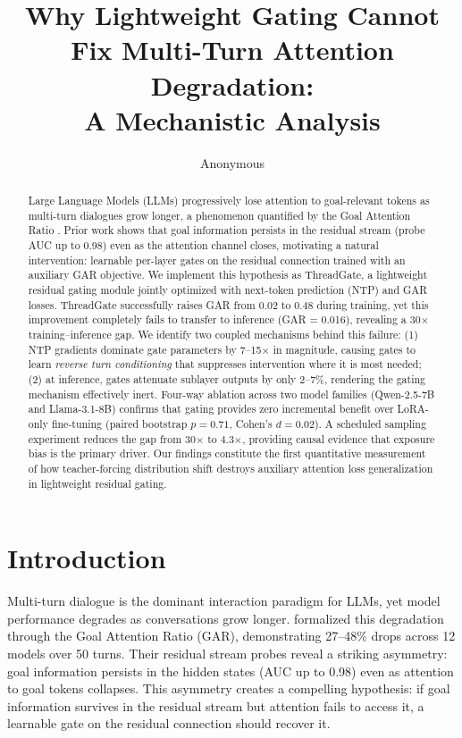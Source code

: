 \documentclass[11pt]{article}
\title{Why Lightweight Gating Cannot Fix Multi-Turn Attention Degradation:\\ A Mechanistic Analysis}
\author{Anonymous}
\begin{document}
\maketitle

\begin{abstract}
Large Language Models (LLMs) progressively lose attention to goal-relevant tokens as multi-turn dialogues grow longer, a phenomenon quantified by the Goal Attention Ratio \citep[GAR;][]{dongre2026}. Prior work shows that goal information persists in the residual stream (probe AUC up to 0.98) even as the attention channel closes, motivating a natural intervention: learnable per-layer gates on the residual connection trained with an auxiliary GAR objective. We implement this hypothesis as ThreadGate, a lightweight residual gating module jointly optimized with next-token prediction (NTP) and GAR losses. ThreadGate successfully raises GAR from 0.02 to 0.48 during training, yet this improvement completely fails to transfer to inference (GAR = 0.016), revealing a 30$\times$ training--inference gap. We identify two coupled mechanisms behind this failure: (1) NTP gradients dominate gate parameters by 7--15$\times$ in magnitude, causing gates to learn \emph{reverse turn conditioning} that suppresses intervention where it is most needed; (2) at inference, gates attenuate sublayer outputs by only 2--7\%, rendering the gating mechanism effectively inert. Four-way ablation across two model families (Qwen-2.5-7B and Llama-3.1-8B) confirms that gating provides zero incremental benefit over LoRA-only fine-tuning (paired bootstrap $p = 0.71$, Cohen's $d = 0.02$). A scheduled sampling experiment reduces the gap from 30$\times$ to 4.3$\times$, providing causal evidence that exposure bias is the primary driver. Our findings constitute the first quantitative measurement of how teacher-forcing distribution shift destroys auxiliary attention loss generalization in lightweight residual gating.
\end{abstract}

\section{Introduction}

Multi-turn dialogue is the dominant interaction paradigm for LLMs, yet model performance degrades as conversations grow longer. \citet{dongre2026} formalized this degradation through the Goal Attention Ratio (GAR), demonstrating 27--48\% drops across 12 models over 50 turns. Their residual stream probes reveal a striking asymmetry: goal information persists in the hidden states (AUC up to 0.98) even as attention to goal tokens collapses. This asymmetry creates a compelling hypothesis: if goal information survives in the residual stream but attention fails to access it, a learnable gate on the residual connection should recover it.
\end{document}

